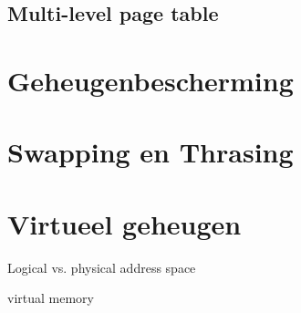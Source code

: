 \subsection{Multi-level page table}


\section{Geheugenbescherming}

\section{Swapping en Thrasing}


\section{Virtueel geheugen}

Logical vs. physical address space

virtual memory



